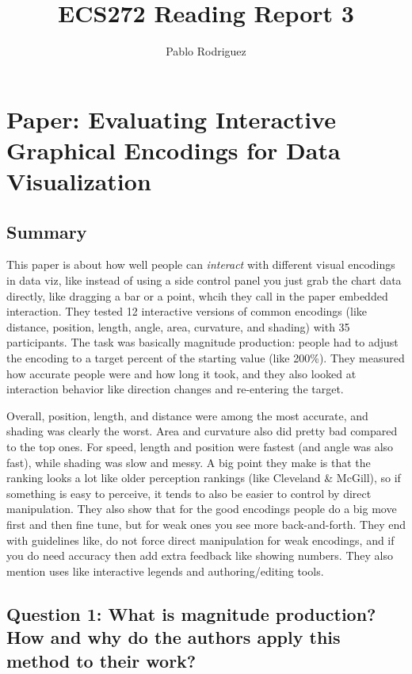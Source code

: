 \documentclass[11pt]{article}
\title{ECS272 Reading Report 3}
\author{Pablo Rodriguez}
\date{}
\begin{document}
\maketitle

\section*{Paper: Evaluating Interactive Graphical Encodings for Data Visualization}

\subsection*{Summary}

This paper is about how well people can \emph{interact} with different visual encodings in data viz, like instead of using a side control panel you just grab the chart data directly, like dragging a bar or a point, whcih they call in the paper embedded interaction. They tested 12 interactive versions of common encodings (like distance, position, length, angle, area, curvature, and shading) with 35 participants. The task was basically magnitude production: people had to adjust the encoding to a target percent of the starting value (like 200\%). They measured how accurate people were and how long it took, and they also looked at interaction behavior like direction changes and re-entering the target.

Overall, position, length, and distance were among the most accurate, and shading was clearly the worst. Area and curvature also did pretty bad compared to the top ones. For speed, length and position were fastest (and angle was also fast), while shading was slow and messy. A big point they make is that the ranking looks a lot like older perception rankings (like Cleveland \& McGill), so if something is easy to perceive, it tends to also be easier to control by direct manipulation. They also show that for the good encodings people do a big move first and then fine tune, but for weak ones you see more back-and-forth. They end with guidelines like, do not force direct manipulation for weak encodings, and if you do need accuracy then add extra feedback like showing numbers. They also mention uses like interactive legends and authoring/editing tools.

\subsection*{Question 1: What is magnitude production? How and why do the authors apply this method to their work?}
\end{document}
